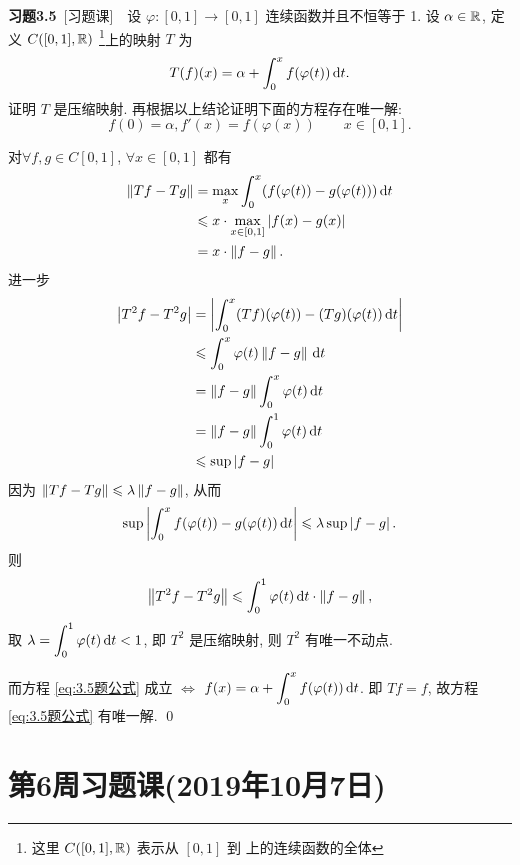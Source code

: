 	\textbf{习题3.5}\ [习题课]\ \ 设 $ \varphi:[0, 1]\to [0, 1] $ 连续函数并且不恒等于 1. 设 $ \alpha\in\mathbb{R} $, 定义 $ C([0, 1],\mathbb{R}) $ \footnote{这里 $ C([0, 1],\mathbb{R}) $ 表示从 $ [0, 1] $ 到 \R 上的连续函数的全体 }上的映射 $ T $ 为
	\[
		T(f)(x)=\alpha+\displaystyle\int_{0}^{x}f(\varphi(t))\,\mathrm{d} t.
	\]
	证明 $ T $ 是压缩映射. 再根据以上结论证明下面的方程存在唯一解:
	\begin{equation}\label{eq:3.5题公式}
		f(0)=\alpha, f'(x)=f(\varphi(x))\qquad x\in[0, 1].
	\end{equation}

	\begin{Proof}
		对$\forall f, g\in C[0, 1]$, $ \forall x\in[0, 1] $ 都有
		\[
			\begin{aligned}
				\left\| Tf-Tg \right\| & =\max_{x}\displaystyle\int_{0}^{x}(f(\varphi(t))-g(\varphi(t)))\,\mathrm{d} t \\
				& \leqslant x\cdot \max_{x\in[0, 1]}\left| f(x)-g(x) \right|  \\
				& =x\cdot \left\| f-g \right\|.
			\end{aligned}
		\]
		进一步 
		\[
			\begin{aligned}
				\left| T^{2}f-T^{2}g \right|  & =\left| \displaystyle\int_{0}^{x}(Tf)(\varphi(t))-(Tg)(\varphi(t))\,\mathrm{d} t \right|  \\
				& \leqslant\displaystyle\int_{0}^{x}\varphi (t)\left\| f-g \right\|\,\mathrm{d} t \\
				& =\left\| f-g \right\|\displaystyle\int_{0}^{x}\varphi(t)\,\mathrm{d} t \\
				& =\left\| f-g \right\|\displaystyle\int_{0}^{1}\varphi(t)\,\mathrm{d} t \\
				& \leqslant \sup \left| f-g \right| 
			\end{aligned}
		\]
		因为 $ \left\| Tf-Tg \right\|\leqslant\lambda\left\| f-g \right\| $, 从而
		\[
			\sup\left| \displaystyle\int_{0}^{x}f(\varphi(t))-g(\varphi(t))\,\mathrm{d} t \right| \leqslant\lambda\sup\left| f-g \right| .
		\]
		则
		\[
			\left\| T^{2}f-T^{2}g \right\|\leqslant\displaystyle\int_{0}^{1}\varphi (t)\,\mathrm{d} t\cdot \left\| f-g \right\|,
		\]
		取 $ \lambda=\displaystyle\int_{0}^{1}\varphi(t)\,\mathrm{d} t<1 $, 即 $ T^{2} $ 是压缩映射, 则 $ T^{2} $ 有唯一不动点.

		而方程 \eqref{eq:3.5题公式} 成立 $ \Longleftrightarrow $ $ f(x)=\alpha +\displaystyle\int_{0}^{x} f(\varphi(t))\,\mathrm{d} t $. 即 $ Tf=f $, 故方程 \eqref{eq:3.5题公式} 有唯一解. \qed
	\end{Proof}
	
\section{第6周习题课(2019年10月7日)}
	
